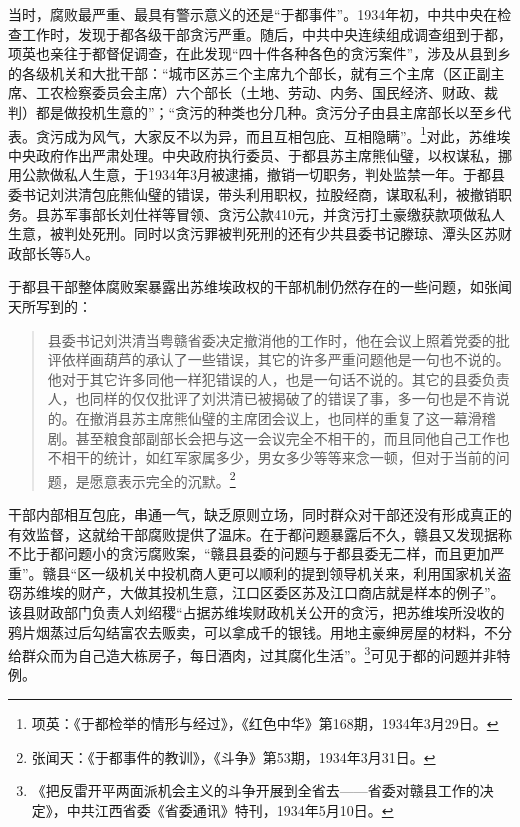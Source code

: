 当时，腐败最严重、最具有警示意义的还是“于都事件”。1934年初，中共中央在检查工作时，发现于都各级干部贪污严重。随后，中共中央连续组成调查组到于都，项英也亲往于都督促调查，在此发现“四十件各种各色的贪污案件”，涉及从县到乡的各级机关和大批干部：“城市区苏三个主席九个部长，就有三个主席（区正副主席、工农检察委员会主席）六个部长（土地、劳动、内务、国民经济、财政、裁判）都是做投机生意的”；“贪污的种类也分几种。贪污分子由县主席部长以至乡代表。贪污成为风气，大家反不以为异，而且互相包庇、互相隐瞒”。\footnote{项英：《于都检举的情形与经过》，《红色中华》第168期，1934年3月29日。}对此，苏维埃中央政府作出严肃处理。中央政府执行委员、于都县苏主席熊仙璧，以权谋私，挪用公款做私人生意，于1934年3月被逮捕，撤销一切职务，判处监禁一年。于都县委书记刘洪清包庇熊仙璧的错误，带头利用职权，拉股经商，谋取私利，被撤销职务。县苏军事部长刘仕祥等冒领、贪污公款410元，并贪污打土豪缴获款项做私人生意，被判处死刑。同时以贪污罪被判死刑的还有少共县委书记滕琼、潭头区苏财政部长等5人。


于都县干部整体腐败案暴露出苏维埃政权的干部机制仍然存在的一些问题，如张闻天所写到的：

\begin{quote}

县委书记刘洪清当粤赣省委决定撤消他的工作时，他在会议上照着党委的批评依样画葫芦的承认了一些错误，其它的许多严重问题他是一句也不说的。他对于其它许多同他一样犯错误的人，也是一句话不说的。其它的县委负责人，也同样的仅仅批评了刘洪清已被揭破了的错误了事，多一句也是不肯说的。在撤消县苏主席熊仙璧的主席团会议上，也同样的重复了这一幕滑稽剧。甚至粮食部副部长会把与这一会议完全不相干的，而且同他自己工作也不相干的统计，如红军家属多少，男女多少等等来念一顿，但对于当前的问题，是愿意表示完全的沉默。\footnote{张闻天：《于都事件的教训》，《斗争》第53期，1934年3月31日。}
\end{quote}


干部内部相互包庇，串通一气，缺乏原则立场，同时群众对干部还没有形成真正的有效监督，这就给干部腐败提供了温床。在于都问题暴露后不久，赣县又发现据称不比于都问题小的贪污腐败案，“赣县县委的问题与于都县委无二样，而且更加严重”。赣县“区一级机关中投机商人更可以顺利的提到领导机关来，利用国家机关盗窃苏维埃的财产，大做其投机生意，江口区委区苏及江口商店就是样本的例子”。该县财政部门负责人刘绍稷“占据苏维埃财政机关公开的贪污，把苏维埃所没收的鸦片烟蒸过后勾结富农去贩卖，可以拿成千的银钱。用地主豪绅房屋的材料，不分给群众而为自己造大栋房子，每日酒肉，过其腐化生活”。\footnote{《把反雷开平两面派机会主义的斗争开展到全省去——省委对赣县工作的决定》，中共江西省委《省委通讯》特刊，1934年5月10日。}可见于都的问题并非特例。


